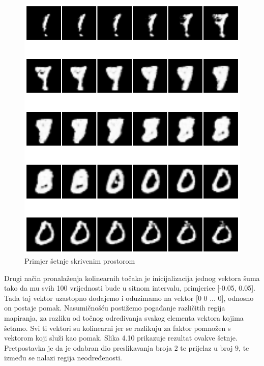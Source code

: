 \documentclass[times, utf8, diplomski]{fer}
\begin{document}
\begin{figure}[H]
    \centering
    \includegraphics[scale=0.65]{Slike/latentwalk0}
    \caption{Primjer šetnje skrivenim prostorom}
\end{figure}

Drugi način pronalaženja kolinearnih točaka je inicijalizacija jednog vektora šuma tako da mu svih 100 vrijednosti bude u sitnom intervalu, primjerice [-0.05, 0.05]. Tada taj vektor uzastopno dodajemo i oduzimamo na vektor [0 0 ... 0], odnosno on postaje pomak. Nasumičnošću postižemo pogađanje različitih regija mapiranja, za  razliku od točnog određivanja svakog elementa vektora kojima šetamo. Svi ti vektori su kolinearni jer se razlikuju za faktor pomnožen s vektorom koji služi kao pomak. Slika 4.10 prikazuje rezultat ovakve šetnje. Pretpostavka je da je odabran dio preslikavanja broja $2$ te prijelaz u broj $9$, te između se nalazi regija neodređenosti.
\end{document}
